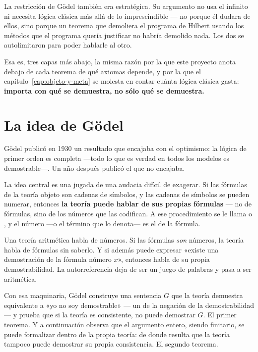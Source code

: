 \begin{leccion}
La restricción de Gödel también era estratégica. Su argumento no usa el infinito ni necesita lógica
clásica más allá de lo imprescindible — no porque él dudara de ellos, sino porque un teorema que
demoliera el programa de Hilbert usando los métodos que el programa quería justificar no habría
demolido nada. Los dos se autolimitaron para poder hablarle al otro.

Esa es, tres capas más abajo, la misma razón por la que este proyecto anota debajo de cada teorema
de qué axiomas depende, y por la que el capítulo~\ref{cap:objeto-y-meta} se molesta en contar
cuánta lógica clásica gasta:
\textbf{importa con qué se demuestra, no sólo qué se demuestra.}
\end{leccion}

\section{La idea de Gödel}

Gödel publicó en 1930 un resultado que encajaba con el optimismo: la lógica de primer orden es
completa —todo lo que es verdad en todos los modelos es demostrable—. Un año después publicó el
que no encajaba.

La idea central es una jugada de una audacia difícil de exagerar. Si las fórmulas de la teoría
objeto son cadenas de símbolos, y las cadenas de símbolos se pueden numerar, entonces \textbf{la
teoría puede hablar de sus propias fórmulas} — no de fórmulas, sino de los números que las
codifican. A ese procedimiento se le llama  o , y el
número —o el término que lo denota— es el  de la fórmula.

\begin{leccion}
Una teoría aritmética habla de números. Si las fórmulas \emph{son} números, la teoría habla de
fórmulas sin saberlo. Y si además puede expresar «existe una demostración de la fórmula número
$x$», entonces habla de su propia demostrabilidad. La autorreferencia deja de ser un juego de
palabras y pasa a ser aritmética.
\end{leccion}

Con esa maquinaria, Gödel construye una sentencia $G$ que la teoría demuestra equivalente a «yo no
soy demostrable» — un  de la negación de la demostrabilidad — y prueba que si la
teoría es consistente, no puede demostrar $G$. El primer teorema. Y a continuación observa que el
argumento entero, siendo finitario, se puede formalizar dentro de la propia teoría: de donde
resulta que la teoría tampoco puede demostrar su propia consistencia. El segundo teorema.

